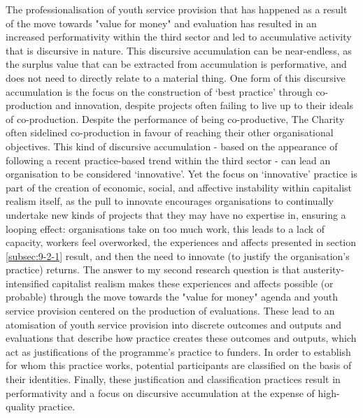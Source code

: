 The professionalisation of youth service provision that has happened as a result of the move towards "value for money" and evaluation has resulted in an increased performativity within the third sector and led to accumulative activity that is discursive in nature. This discursive accumulation can be near-endless, as the surplus value that can be extracted from accumulation is performative, and does not need to directly relate to a material thing. One form of this discursive accumulation is the focus on the construction of `best practice' through co-production and innovation, despite projects often failing to live up to their ideals of co-production. Despite the performance of being co-productive, The Charity often sidelined co-production in favour of reaching their other organisational objectives. This kind of discursive accumulation - based on the appearance of following a recent practice-based trend within the third sector - can lead an organisation to be considered `innovative'. Yet the focus on `innovative' practice is part of the creation of economic, social, and affective instability within capitalist realism itself, as the pull to innovate encourages organisations to continually undertake new kinds of projects that they may have no expertise in, ensuring a looping effect: organisations take on too much work, this leads to a lack of capacity, workers feel overworked, the experiences and affects presented in section \ref{subsec:9-2-1} result, and then the need to innovate (to justify the organisation's practice) returns.  The answer to my second research question is that austerity-intensified capitalist realism makes these experiences and affects possible (or probable) through the move towards the "value for money" agenda and youth service provision centered on the production of evaluations. These lead to an atomisation of youth service provision into discrete outcomes and outputs and evaluations that describe how practice creates these outcomes and outputs, which act as justifications of the programme's practice to funders. In order to establish for whom this practice works, potential participants are classified on the basis of their identities. Finally, these justification and classification practices result in performativity and a focus on discursive accumulation at the expense of high-quality practice. 

